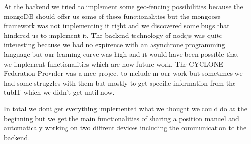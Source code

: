 At the backend we tried to implement some geo-fencing possibilities because the mongoDB should offer us some of these functionalities but the mongoose framework was not implementing it right and we discovered some bugs that hindered us to implement it. The backend technology of nodejs was quite interesting because we had no expirence with an asynchrone programming language but our learning curve was high and it would have been possible that we implement functionalities which are now future work. The CYCLONE Federation Provider was a nice project to include in our work but sometimes we had some struggles with them but mostly to get specific information from the tubIT which we didn't get until now.

In total we dont get everything implemented what we thought we could do at the beginning but we get the main functionalities of sharing a position manuel and automaticaly working on two diffrent devices including the communication to the backend.

